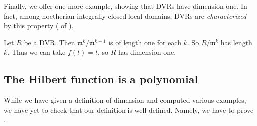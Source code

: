 Finally, we offer one more example, showing that DVRs have dimension one. In
fact, among noetherian integrally closed local domains, DVRs are
\emph{characterized} by this property (\rref{} of \rref{}).

\begin{example}
Let $R$ be a DVR. Then $\mathfrak{m}^k/\mathfrak{m}^{k+1}$ is of length one for
each $k$. So $R/\mathfrak{m}^k$ has length $k$. Thus we can take $f(t) = t$, so
$R$ has dimension one.
\end{example} 

\subsection{The Hilbert function is a polynomial} 

While we have given a definition of dimension and computed various examples,
we have yet to check that our definition is well-defined. 
Namely, we have to prove .

